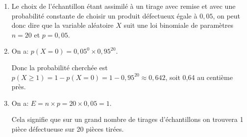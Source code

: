\begin{enumerate}
\item %
Le choix de l'échantillon étant assimilé à un tirage avec remise et avec une probabilité constante de choisir un produit défectueux égale à $ 0,05$, on peut donc dire que la variable aléatoire $X$ suit une loi binomiale de paramètres $n = 20$ et $p  = 0,05$.
\item %

On a: $p(X = 0) = 0,05^0 \times 0,95^{20}$.

Donc la probabilité cherchée est $p(X \geqslant 1) = 1 -p(X =0) = 1 - 0,95^{20} \approx 0,642$, soit 0,64 au centième près.
\item %
On a: $E = n \times p = 20 \times 0,05 = 1$.

Cela signifie que sur un grand nombre de tirages d'échantillons on trouvera 1 pièce défectueuse sur 20 pièces tirées.
\end{enumerate}

\vspace{0,5cm}

